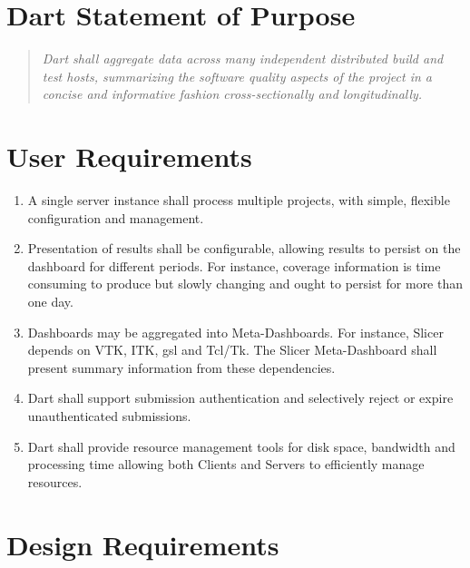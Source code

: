 \documentclass{InsightBook}
\begin{document}
\section{Dart Statement of Purpose}
\begin{quote}
\emph{Dart shall aggregate data across many independent distributed
build and test hosts, summarizing the software quality aspects of the project
in a concise and informative fashion cross-sectionally and longitudinally.}
\end{quote}

\section{User Requirements}
\begin{enumerate}
\item A single server instance shall process multiple projects, with
simple, flexible configuration and management.
\item Presentation of results shall be configurable, allowing results
to persist on the dashboard for different periods.  For instance,
coverage information is time consuming to produce but slowly
changing and ought to persist for more than one day.
\item Dashboards may be aggregated into Meta-Dashboards.  For
instance, Slicer depends on VTK, ITK, gsl and Tcl/Tk.  The Slicer
Meta-Dashboard shall present summary information from these
dependencies.
\item Dart shall support submission authentication and selectively
reject or expire unauthenticated submissions.
\item Dart shall provide resource management tools for disk space,
bandwidth and processing time allowing both Clients and Servers to
efficiently manage resources.
\end{enumerate}

\section{Design Requirements}
\end{document}
